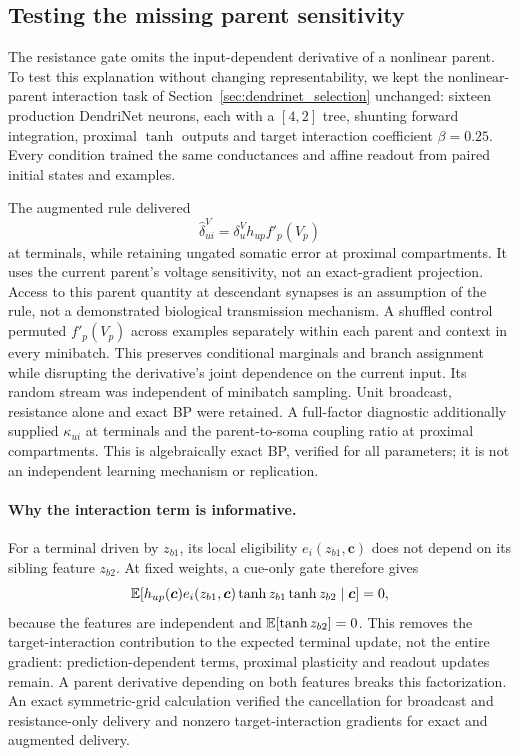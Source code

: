 \subsection{Testing the missing parent sensitivity}
\label{sec:parent_sensitivity}

The resistance gate omits the input-dependent derivative of a nonlinear
parent. To test this explanation without changing representability, we kept
the nonlinear-parent interaction task of Section~\ref{sec:dendrinet_selection}
unchanged: sixteen production DendriNet neurons, each with a $[4,2]$ tree,
shunting forward integration, proximal $\tanh$ outputs and target interaction
coefficient $\beta=0.25$. Every condition trained the same conductances and
affine readout from paired initial states and examples.

The augmented rule delivered
\[
\widehat\delta^V_{ui}=\delta_u^V h_{up}f'_p(V_p)
\]
at terminals, while retaining ungated somatic error at proximal compartments.
It uses the current parent's voltage sensitivity, not an exact-gradient
projection. Access to this parent quantity at descendant synapses is an
assumption of the rule, not a demonstrated biological transmission mechanism.
A shuffled control permuted $f'_p(V_p)$ across examples separately within
each parent and context in every minibatch. This preserves conditional
marginals and branch assignment while disrupting the derivative's joint
dependence on the current input. Its random stream was independent of
minibatch sampling. Unit broadcast, resistance alone and exact BP were
retained. A full-factor diagnostic additionally supplied $\kappa_{ui}$ at
terminals and the parent-to-soma coupling ratio at proximal compartments.
This is algebraically exact BP, verified for all parameters; it is not an
independent learning mechanism or replication.

\paragraph{Why the interaction term is informative.}
For a terminal driven by $z_{b1}$, its local eligibility
$e_i(z_{b1},\bm c)$ does not depend on its sibling feature $z_{b2}$.
At fixed weights, a cue-only gate therefore gives
\[
\mathbb{E}\!\left[h_{up}(\bm c)e_i(z_{b1},\bm c)
          \tanh z_{b1}\tanh z_{b2}\mid\bm c\right]=0,
\]
because the features are independent and $\mathbb{E}[\tanh z_{b2}]=0$.
This removes the target-interaction contribution to the expected terminal
update, not the entire gradient: prediction-dependent terms, proximal
plasticity and readout updates remain. A parent derivative depending on both
features breaks this factorization. An exact symmetric-grid calculation
verified the cancellation for broadcast and resistance-only delivery and
nonzero target-interaction gradients for exact and augmented delivery.

